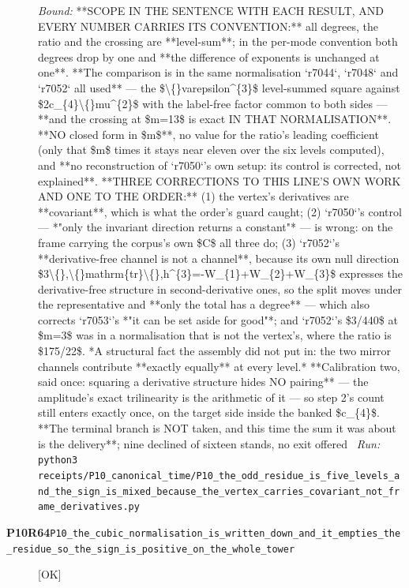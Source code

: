 \begin{description}
 \emph{Bound:}  **SCOPE IN THE SENTENCE WITH EACH RESULT, AND EVERY NUMBER CARRIES ITS CONVENTION:** all degrees, the ratio and the crossing are **level-sum**; in the per-mode convention both degrees drop by one and **the difference of exponents is unchanged at one**.  **The comparison is in the same normalisation `r7044`, `r7048` and `r7052` all used** --- the \$\textbackslash\{\}varepsilon\textasciicircum{}\{3\}\$ level-summed square against \$2c\_\{4\}\textbackslash\{\}mu\textasciicircum{}\{2\}\$ with the label-free factor common to both sides --- **and the crossing at \$m=13\$ is exact IN THAT NORMALISATION**.  **NO closed form in \$m\$**, no value for the ratio's leading coefficient (only that \$m\$ times it stays near eleven over the six levels computed), and **no reconstruction of `r7050`'s own setup: its control is corrected, not explained**.  **THREE CORRECTIONS TO THIS LINE'S OWN WORK AND ONE TO THE ORDER:** (1) the vertex's derivatives are **covariant**, which is what the order's guard caught; (2) `r7050`'s control --- *"only the invariant direction returns a constant"* --- is wrong: on the frame carrying the corpus's own \$C\$ all three do; (3) `r7052`'s **derivative-free channel is not a channel**, because its own null direction \$3\textbackslash\{\},\textbackslash\{\}mathrm\{tr\}\textbackslash\{\},h\textasciicircum{}\{3\}=-W\_\{1\}+W\_\{2\}+W\_\{3\}\$ expresses the derivative-free structure in second-derivative ones, so the split moves under the representative and **only the total has a degree** --- which also corrects `r7053`'s *"it can be set aside for good"*; and `r7052`'s \$3/440\$ at \$m=3\$ was in a normalisation that is not the vertex's, where the ratio is \$175/22\$.  *A structural fact the assembly did not put in: the two mirror channels contribute **exactly equally** at every level.*  **Calibration two, said once: squaring a derivative structure hides NO pairing** --- the amplitude's exact trilinearity is the arithmetic of it --- so step 2's count still enters exactly once, on the target side inside the banked \$c\_\{4\}\$.  **The terminal branch is NOT taken, and this time the sum it was about is the delivery**; nine declined of sixteen stands, no exit offered
\ \emph{Run:} \texttt{python3 receipts/P10\_canonical\_time/P10\_the\_odd\_residue\_is\_five\_levels\_and\_the\_sign\_is\_mixed\_because\_the\_vertex\_carries\_covariant\_not\_frame\_derivatives.py}
\item[\rcptlabel{P10_the_cubic_normalisation_is_written_down_and_it_empties_the_residue_so_the_sign_is_positive_on_the_whole_tower}{P10R64}\textbf{P10R64}\quad\texttt{P10\_the\_cubic\_normalisation\_is\_written\_down\_and\_it\_empties\_the\_residue\_so\_the\_sign\_is\_positive\_on\_the\_whole\_tower}]\hfill\textsf{[OK]}\\

\end{description}
